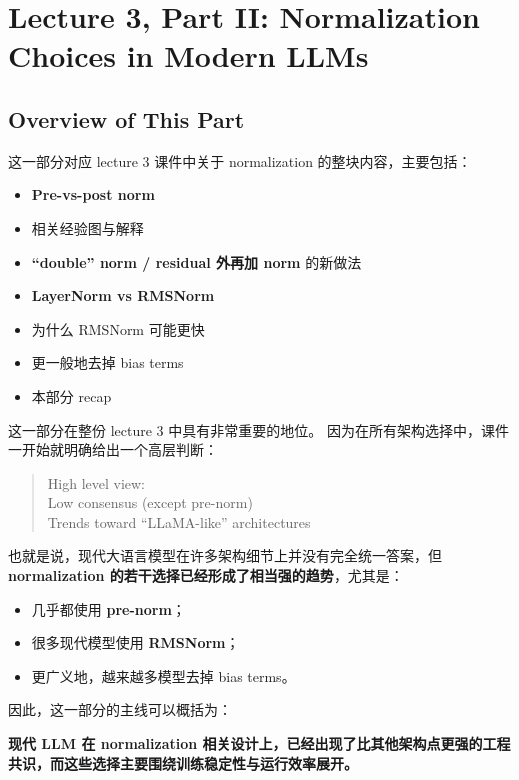 \documentclass[a4paper,UTF8]{article}
\numberwithin{equation}{section}
\begin{document}




\section{Lecture 3, Part II: Normalization Choices in Modern LLMs}

\subsection{Overview of This Part}

这一部分对应 lecture 3 课件中关于 normalization 的整块内容，主要包括：
\begin{itemize}
    \item \textbf{Pre-vs-post norm}
    \item 相关经验图与解释
    \item \textbf{``double'' norm / residual 外再加 norm} 的新做法
    \item \textbf{LayerNorm vs RMSNorm}
    \item 为什么 RMSNorm 可能更快
    \item 更一般地去掉 bias terms
    \item 本部分 recap
\end{itemize}

这一部分在整份 lecture 3 中具有非常重要的地位。  
因为在所有架构选择中，课件一开始就明确给出一个高层判断：

\begin{quote}
High level view: \\
Low consensus (except pre-norm) \\
Trends toward ``LLaMA-like'' architectures
\end{quote}

也就是说，现代大语言模型在许多架构细节上并没有完全统一答案，但 \textbf{normalization 的若干选择已经形成了相当强的趋势}，尤其是：
\begin{itemize}
    \item 几乎都使用 \textbf{pre-norm}；
    \item 很多现代模型使用 \textbf{RMSNorm}；
    \item 更广义地，越来越多模型去掉 bias terms。
\end{itemize}

因此，这一部分的主线可以概括为：
\begin{center}
\textbf{现代 LLM 在 normalization 相关设计上，已经出现了比其他架构点更强的工程共识，而这些选择主要围绕训练稳定性与运行效率展开。}
\end{center}
\end{document}
